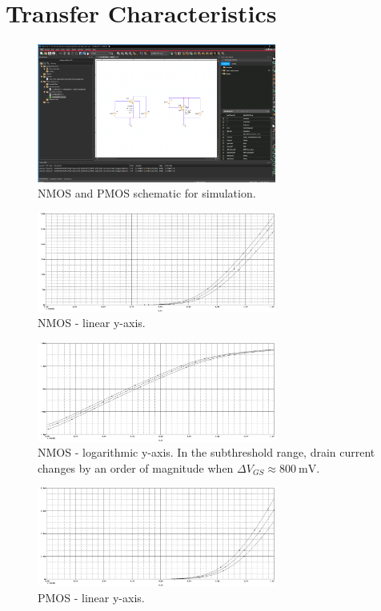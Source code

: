 \documentclass{article}
\begin{document}
	
	\section{Transfer Characteristics}

	\begin{figure}[H]
	    \centering
	    \includegraphics[width=0.7\textwidth]{1-sch}
	    \caption{NMOS and PMOS schematic for simulation.}
	\end{figure}


	\begin{figure}[H]
	    \centering
	    \includegraphics[width=0.7\textwidth]{1-nmos-lin}
	    \caption{NMOS - linear y-axis.}
	\end{figure}

	\begin{figure}[H]
	    \centering
	    \includegraphics[width=0.7\textwidth]{1-nmos-log}
	    \caption{NMOS - logarithmic y-axis. In the subthreshold range, drain current changes by an order of magnitude when $\Delta V_{GS} \approx \SI{800}{\mV}$.}
	\end{figure}

	\begin{figure}[H]
	    \centering
	    \includegraphics[width=0.7\textwidth]{1-pmos-lin}
	    \caption{PMOS - linear y-axis.}
	\end{figure}
\end{document}
